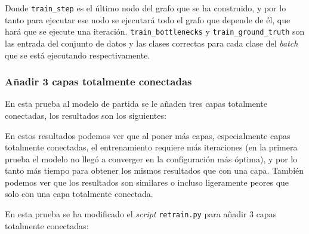 \documentclass[12pt,a4paper]{article}
\begin{document}
Donde \texttt{train\_step} es el último nodo del grafo que se ha construido, y por lo tanto para ejecutar ese nodo se ejecutará todo el grafo que depende de él, que hará que se ejecute una iteración. \texttt{train\_bottlenecks} y \texttt{train\_ground\_truth} son las entrada del conjunto de datos y las clases correctas para cada clase del \textit{batch} que se está ejecutando respectivamente.

\subsubsection{Añadir 3 capas totalmente conectadas}
En esta prueba al modelo de partida se le añaden tres capas totalmente conectadas, los resultados son los siguientes:

\begin{table}[H]
\centering
{}
\caption{Resultados añadir 3 capas totalmente conectadas.}
\end{table}

En estos resultados podemos ver que al poner más capas, especialmente capas totalmente conectadas, el entrenamiento requiere más iteraciones (en la primera prueba el modelo no llegó a converger en la configuración más óptima), y por lo tanto más tiempo para obtener los mismos resultados que con una capa. También podemos ver que los resultados son similares o incluso ligeramente peores que solo con una capa totalmente conectada.
\bigskip

En esta prueba se ha modificado el \textit{script} \texttt{retrain.py} para añadir 3 capas totalmente conectadas:
\end{document}
